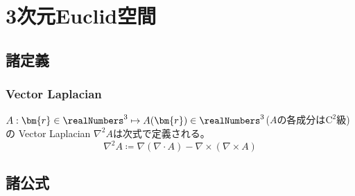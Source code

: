 \chapter{3次元Euclid空間}
    \section{諸定義}
        \subsection{Vector Laplacian}
            \label{VectorLaplacian}
            \begin{definition}
                $A: \bm{r}\in\realNumbers^3 \mapsto A(\bm{r}) \in \realNumbers^3$($A$の各成分は$\mathrm{C}^2$級)の Vector Laplacian $\nabla^2 A$は次式で定義される。
                \[ \nabla^2A \coloneq \nabla(\nabla\cdot A) - \nabla\times(\nabla\times A) \]
            \end{definition}
    \section{諸公式}
